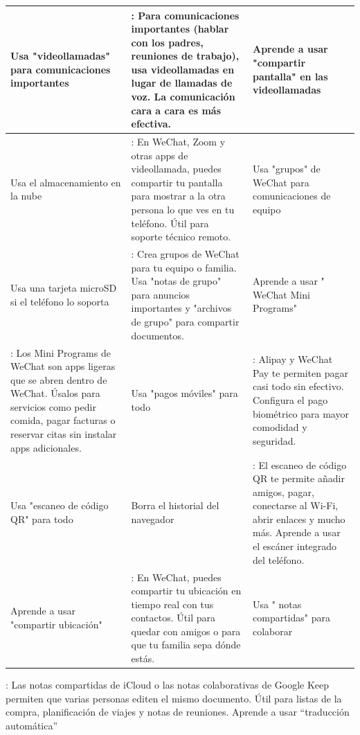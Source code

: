 \begin{center}
\begin{tabularx}{\linewidth}{|X|X|X|}
\hline
\textbf{Usa "videollamadas" para comunicaciones importantes} & \textbf{: Para comunicaciones importantes (hablar con los padres, reuniones de trabajo), usa videollamadas en lugar de llamadas de voz. La comunicación cara a cara es más efectiva.} & \textbf{Aprende a usar "compartir pantalla" en las videollamadas} \tabularnewline
\hline
Usa el almacenamiento en la nube & : En WeChat, Zoom y otras apps de videollamada, puedes compartir tu pantalla para mostrar a la otra persona lo que ves en tu teléfono. Útil para soporte técnico remoto. & Usa "grupos" de WeChat para comunicaciones de equipo \tabularnewline
Usa una tarjeta microSD si el teléfono lo soporta & : Crea grupos de WeChat para tu equipo o familia. Usa "notas de grupo" para anuncios importantes y "archivos de grupo" para compartir documentos. & Aprende a usar " WeChat Mini Programs" \tabularnewline
: Los Mini Programs de WeChat son apps ligeras que se abren dentro de WeChat. Úsalos para servicios como pedir comida, pagar facturas o reservar citas sin instalar apps adicionales. & Usa "pagos móviles" para todo & : Alipay y WeChat Pay te permiten pagar casi todo sin efectivo. Configura el pago biométrico para mayor comodidad y seguridad. \tabularnewline
Usa "escaneo de código QR" para todo & Borra el historial del navegador & : El escaneo de código QR te permite añadir amigos, pagar, conectarse al Wi-Fi, abrir enlaces y mucho más. Aprende a usar el escáner integrado del teléfono. \tabularnewline
Aprende a usar "compartir ubicación" & : En WeChat, puedes compartir tu ubicación en tiempo real con tus contactos. Útil para quedar con amigos o para que tu familia sepa dónde estás. & Usa " notas compartidas" para colaborar \tabularnewline
\hline
\end{tabularx}
\end{center}

\begin{tcbwarn}{: Las notas compartidas de iCloud o las notas colaborativas de Google Keep permiten que varias personas editen el mismo documento. Útil para listas de la compra, planificación de viajes y notas de reuniones.}
Aprende a usar “traducción automática”

\end{tcbwarn}


